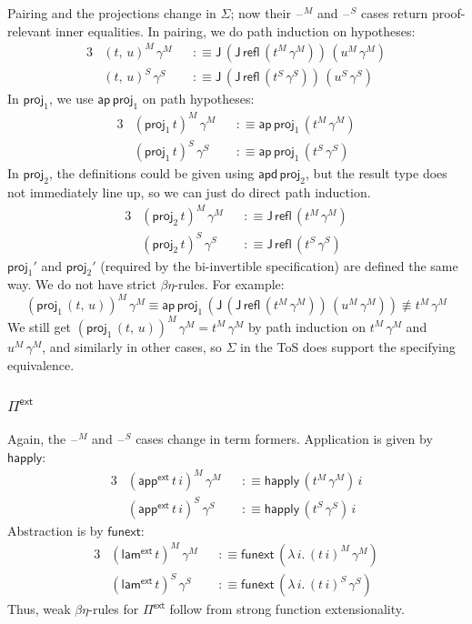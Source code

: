 \documentclass[12pt,a4paper,twoside,openany]{book}
\theoremstyle{remark}
\theoremstyle{definition}
\theoremstyle{theorem}
\newcommand{\ms}[1]{\mathsf{#1}}
\newcommand{\ap}{\ms{ap}}
\newcommand{\apd}{\ms{apd}}
\newcommand{\happly}{\ms{happly}}
\newcommand{\funext}{\ms{funext}}
\newcommand{\J}{\ms{J}}
\newcommand{\refl}{\mathsf{refl}}
\newcommand{\proj}{\mathsf{proj}}
\newcommand{\blank}{\mathord{\hspace{1pt}\text{--}\hspace{1pt}}}
\newcommand{\Piinf}{\Pi^{\mathsf{ext}}}
\newcommand{\appinf}{\mathsf{app^{ext}}}
\newcommand{\laminf}{\mathsf{lam^{ext}}}
\newcommand{\defn}{:\equiv}
\begin{document}
Pairing and the projections change in $\Sigma$; now their $\blank^M$ and
$\blank^S$ cases return proof-relevant inner equalities. In pairing, we do path
induction on hypotheses:
\begin{alignat*}{3}
  &(t,\,u)^M\,\gamma^M &&\defn \J\,(\J\,\refl\,(t^M\,\gamma^M))\,(u^M\,\gamma^M)\\
  &(t,\,u)^S\,\gamma^S &&\defn \J\,(\J\,\refl\,(t^S\,\gamma^S))\,(u^S\,\gamma^S)
\end{alignat*}
In $\proj_1$, we use $\ap\,\proj_1$ on path hypotheses:
\begin{alignat*}{3}
  &(\proj_1\,t)^M\,\gamma^M &&\defn \ap\,\proj_1\,(t^M\,\gamma^M)\\
  &(\proj_1\,t)^S\,\gamma^S &&\defn \ap\,\proj_1\,(t^S\,\gamma^S)
\end{alignat*}
In $\proj_2$, the definitions could be given using $\apd\,\proj_2$, but the
result type does not immediately line up, so we can just do direct path induction.
\begin{alignat*}{3}
  &(\proj_2\,t)^M\,\gamma^M &&\defn \J\,\refl\,(t^M\,\gamma^M)\\
  &(\proj_2\,t)^S\,\gamma^S &&\defn \J\,\refl\,(t^S\,\gamma^S)
\end{alignat*}
$\proj_1'$ and $\proj_2'$ (required by the bi-invertible specification) are defined
the same way. We do not have strict $\beta\eta$-rules. For example:
\[ (\proj_1\,(t,\,u))^M\,\gamma^M \equiv \ap\,\proj_1\,(\J\,(\J\,\refl\,(t^M\,\gamma^M))\,(u^M\,\gamma^M)) \not\equiv t^M\,\gamma^M \]
We still get $(\proj_1\,(t,\,u))^M\,\gamma^M = t^M\,\gamma^M$ by path induction on
$t^M\,\gamma^M$ and $u^M\,\gamma^M$, and similarly in other cases, so $\Sigma$ in the ToS
does support the specifying equivalence.

\subsubsection{$\ms{\Piinf}$}
Again, the $\blank^M$ and $\blank^S$ cases change in term formers. Application
is given by $\happly$:
\begin{alignat*}{3}
  &(\appinf\,t\,i)^M\,\gamma^M &&\defn \happly\,(t^M\,\gamma^M)\,i\\
  &(\appinf\,t\,i)^S\,\gamma^S &&\defn \happly\,(t^S\,\gamma^S)\,i
\end{alignat*}
Abstraction is by $\funext$:
\begin{alignat*}{3}
  &(\laminf\,t)^M\,\gamma^M &&\defn \funext\,(\lambda\,i.\,(t\,i)^M\,\gamma^M)\\
  &(\laminf\,t)^S\,\gamma^S &&\defn \funext\,(\lambda\,i.\,(t\,i)^S\,\gamma^S)
\end{alignat*}
Thus, weak $\beta\eta$-rules for $\Piinf$ follow from strong function extensionality.
\end{document}
